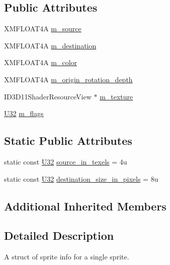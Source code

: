 \subsection*{Public Attributes}
\begin{DoxyCompactItemize}
\item 
X\+M\+F\+L\+O\+A\+T4A \hyperlink{structmage_1_1_sprite_info_a15e373b0b7edf90e512a4a0f665c810f}{m\+\_\+source}
\item 
X\+M\+F\+L\+O\+A\+T4A \hyperlink{structmage_1_1_sprite_info_a40a00e6cf76fc333309d706f064deed8}{m\+\_\+destination}
\item 
X\+M\+F\+L\+O\+A\+T4A \hyperlink{structmage_1_1_sprite_info_ab76316069522fc10f9580b705406ed16}{m\+\_\+color}
\item 
X\+M\+F\+L\+O\+A\+T4A \hyperlink{structmage_1_1_sprite_info_ae8026876747e7b5924d6940551895ccd}{m\+\_\+origin\+\_\+rotation\+\_\+depth}
\item 
I\+D3\+D11\+Shader\+Resource\+View $\ast$ \hyperlink{structmage_1_1_sprite_info_aea9963f991406a050bc5759fb05cfd5e}{m\+\_\+texture}
\item 
\hyperlink{namespacemage_a41c104c036fba3756a74e19f793eeaa1}{U32} \hyperlink{structmage_1_1_sprite_info_a9f3802944651a58e02831e5f2cb4a53e}{m\+\_\+flags}
\end{DoxyCompactItemize}
\subsection*{Static Public Attributes}
\begin{DoxyCompactItemize}
\item 
static const \hyperlink{namespacemage_a41c104c036fba3756a74e19f793eeaa1}{U32} \hyperlink{structmage_1_1_sprite_info_afe8aa37311d56f8411cfe878607f6f68}{source\+\_\+in\+\_\+texels} = 4u
\item 
static const \hyperlink{namespacemage_a41c104c036fba3756a74e19f793eeaa1}{U32} \hyperlink{structmage_1_1_sprite_info_a84baaa1612a26bcc076965c0997641c3}{destination\+\_\+size\+\_\+in\+\_\+pixels} = 8u
\end{DoxyCompactItemize}
\subsection*{Additional Inherited Members}


\subsection{Detailed Description}
A struct of sprite info for a single sprite. 

